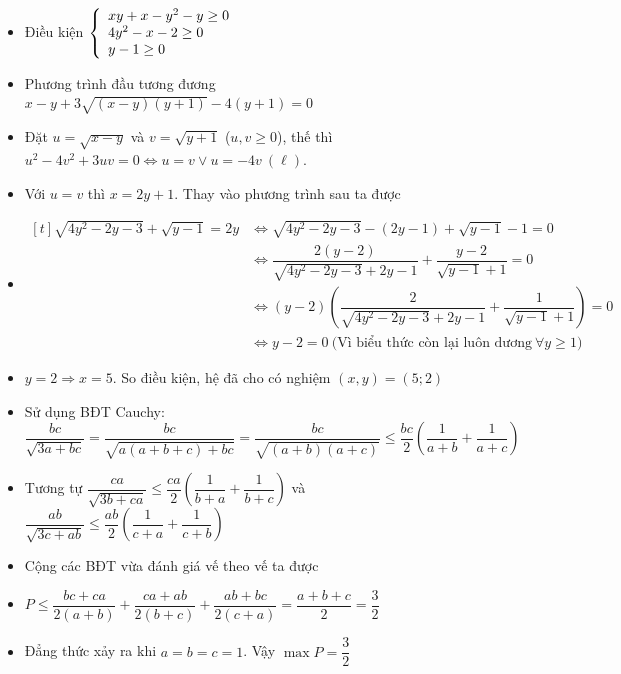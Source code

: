 \lgi 
\begin{itemize}[label=,leftmargin=*]
\item Điều kiện $\left\{\begin{array}{ll}xy+x-y^2-y\ge 0 \\ 4y^2-x-2\ge 0 \\ y-1\ge 0\end{array}\right.$
\item Phương trình đầu tương đương $x-y+3\sqrt{(x-y)(y+1)}-4(y+1)=0$
\item Đặt $u=\sqrt{x-y}$ và $v=\sqrt{y+1}$ ($u,v\ge 0$), thế thì $u^2-4v^2+3uv=0\Leftrightarrow u=v \vee u=-4v \ (\ell)$.
\item Với $u=v$ thì $x=2y+1$. Thay vào phương trình sau ta được 
\item $\begin{aligned}[t]\sqrt{4y^2-2y-3}+\sqrt{y-1}=2y &\Leftrightarrow \sqrt{4y^2-2y-3}-(2y-1)+\sqrt{y-1}-1=0 \\
&\Leftrightarrow \dfrac{2(y-2)}{\sqrt{4y^2-2y-3}+2y-1}+\dfrac{y-2}{\sqrt{y-1}+1}=0 \\
&\Leftrightarrow (y-2)\left(\dfrac{2}{\sqrt{4y^2-2y-3}+2y-1}+\dfrac{1}{\sqrt{y-1}+1} \right)=0 \\
&\Leftrightarrow y-2=0 \ \text{(Vì biểu thức còn lại luôn dương} \ \forall y \ge 1)\end{aligned}$
\item $y=2\Rightarrow x=5$. So điều kiện, hệ đã cho có nghiệm $(x,y)=(5;2)$
\end{itemize}


\lgi 
\begin{itemize}[label=,leftmargin=*]
\item Sử dụng BĐT Cauchy: $\dfrac{bc}{\sqrt{3a+bc}}=\dfrac{bc}{\sqrt{a(a+b+c)+bc}}=\dfrac{bc}{\sqrt{(a+b)(a+c)}}\le \dfrac{bc}{2}\left(\dfrac{1}{a+b}+\dfrac{1}{a+c} \right)$
\item Tương tự $\dfrac{ca}{\sqrt{3b+ca}} \le \dfrac{ca}{2}\left(\dfrac{1}{b+a}+\dfrac{1}{b+c} \right)$ và $\dfrac{ab}{\sqrt{3c+ab}}\le \dfrac{ab}{2}\left(\dfrac{1}{c+a}+\dfrac{1}{c+b} \right)$
\item Cộng các BĐT vừa đánh giá vế theo vế ta được
\item $P\le \dfrac{bc+ca}{2(a+b)}+\dfrac{ca+ab}{2(b+c)}+\dfrac{ab+bc}{2(c+a)}=\dfrac{a+b+c}{2}=\dfrac{3}{2}$
\item Đẳng thức xảy ra khi $a=b=c=1$. Vậy $\max P=\dfrac{3}{2}$
\end{itemize}

